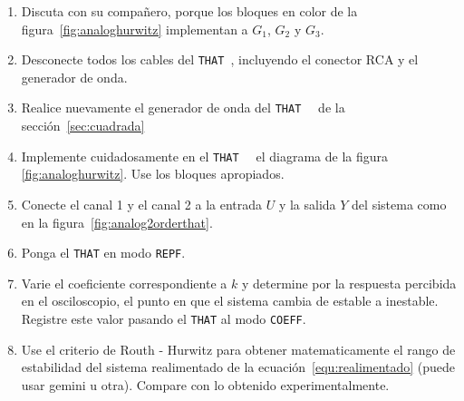 \documentclass[]{scrartcl}
\newcommand{\tt}[1]{\texttt{#1}}
\newcommand{\that}[0]{\texttt{THAT~}}
\begin{document}
\begin{enumerate}[label=\alph*)]
		
	\item Discuta con su compañero, porque los bloques en color de la figura~\ref{fig:analoghurwitz} implementan a $G_1$, $G_2$ y $G_3$.
	
	\item Desconecte todos los cables del \that, incluyendo el conector RCA y el generador de onda.
	
	\item Realice nuevamente el generador de onda del \that~ de  la sección~\ref{sec:cuadrada} 
	
	\item Implemente cuidadosamente en el \that~ el diagrama de la figura \ref{fig:analoghurwitz}. Use los bloques apropiados.
	\item Conecte el canal 1 y el canal 2 a la entrada $U$ y la salida $Y$ del sistema como en la figura~\ref{fig:analog2orderthat}.
	
	\item Ponga el \tt{THAT} en modo \tt{REPF}.
	
	\item Varie el coeficiente correspondiente a $k$ y determine por la respuesta percibida en el osciloscopio, el punto en que el sistema cambia de estable a inestable. Registre este valor pasando el \tt{THAT} al modo \tt{COEFF}.
	
	\item Use el criterio de Routh - Hurwitz  para obtener matematicamente el rango de estabilidad del sistema realimentado de la ecuación~\eqref{equ:realimentado} (puede usar gemini u otra). Compare con lo obtenido experimentalmente.
\end{enumerate}
\end{document}
